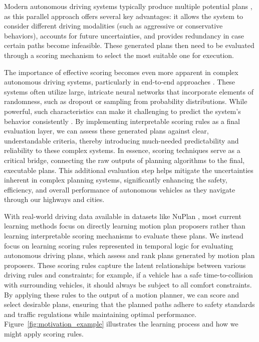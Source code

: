 Modern autonomous driving systems typically produce multiple potential plans \cite{Dauner2023CORL,hu2023planning,phan2022driving,jiang2022efficient,chen2024end}, as this parallel approach offers several key advantages: it allows the system to consider different driving modalities (such as aggressive or conservative behaviors), accounts for future uncertainties, and provides redundancy in case certain paths become infeasible. These generated plans then need to be evaluated through a scoring mechanism to select the most suitable one for execution.

The importance of effective scoring becomes even more apparent in complex autonomous driving systems, particularly in end-to-end approaches \cite{hu2023planning,chen2024end}. These systems often utilize large, intricate neural networks that incorporate elements of randomness, such as dropout or sampling from probability distributions. While powerful, such characteristics can make it challenging to predict the system's behavior consistently \cite{chen2024end}. By implementing interpretable scoring rules as a final evaluation layer, we can assess these generated plans against clear, understandable criteria, thereby introducing much-needed predictability and reliability to these complex systems. In essence, scoring techniques serve as a critical bridge, connecting the raw outputs of planning algorithms to the final, executable plans. This additional evaluation step helps mitigate the uncertainties inherent in complex planning systems, significantly enhancing the safety, efficiency, and overall performance of autonomous vehicles as they navigate through our highways and cities.

With real-world driving data available in datasets like NuPlan \cite{Karnchanachari2024TowardsLP}, most current learning methods focus on directly learning motion plan proposers rather than learning interpretable scoring mechanisms to evaluate these plans. We instead focus on learning scoring rules represented in temporal logic for evaluating autonomous driving plans, which assess and rank plans generated by motion plan proposers. These scoring rules capture the latent relationships between various driving rules and constraints; for example, if a vehicle has a safe time-to-collision with surrounding vehicles, it should always be subject to all comfort constraints. By applying these rules to the output of a motion planner, we can score and select desirable plans, ensuring that the planned paths adhere to safety standards and traffic regulations while maintaining optimal performance. Figure~\ref{fig:motivation_example} illustrates the learning process and how we might apply scoring rules.

